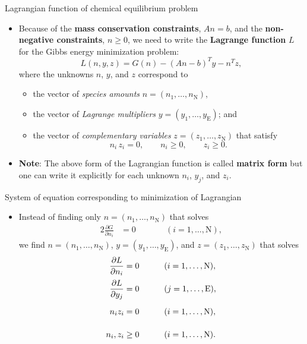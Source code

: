 %
%
\begin{frame}{Lagrangian function of chemical equilibrium problem}
\begin{itemize}
\item Because of the {\bf mass conservation constraints}, $An=b$, and
the {\bf non-negative constraints}, $n\geq0$, we need to write
the \alert{\textbf{Lagrange function}} $L$ for the Gibbs energy minimization problem:
\[
L(n,y,z)=G(n)-(An-b)^{T}y-n^{T}z,
\]
where the \alert{unknowns} $n$, $y$, and $z$ correspond to
%
\begin{itemize}
\item the vector of \emph{species amounts} $n=(n_{1},\ldots,n_{\text{N}})$, 
\item the vector of \emph{Lagrange multipliers} $y=(y_{1},\ldots,y_{\text{E}})$; and 
\item the vector of \emph{complementary variables} $z=(z_{1},\ldots,z_{\text{N}})$ that satisfy 
%	
\[
n_{i}\, z_{i}=0,\qquad n_{i}\geq0,\qquad z_{i}\geq0.
\]
\end{itemize}
\pause
\item {\bf Note}: The above form of the Lagrangian function is called {\bf matrix form} but one can write it explicitly for each unknown $n_{i}$, $y_{j}$, and $z_{i}$. 
\end{itemize}
\end{frame}
%
%
\begin{frame}{System of equation corresponding to minimization of Lagrangian}
\begin{itemize}
\item Instead of finding \alert{only} $n=(n_{1},\ldots,n_{\text{N}})$ that solves 
\begin{alignat*}{2}
\frac{\partial G}{\partial n_{i}} & =0 & \qquad & (i=1,\ldots,\text{N}),
\end{alignat*}
\pause
 we find \alert{$n=(n_{1},\ldots,n_{\text{N}})$}, \alert{$y=(y_{1},\ldots,y_{\text{E}})$},
and \alert{$z=(z_{1},\ldots,z_{\text{N}})$} that solves 
\begin{alignat*}{2}
\frac{\partial L}{\partial n_{i}} & =0 & \qquad\vphantom{\frac{\partial L}{\partial y_{j}}} & (i=1,\ldots,\text{N}),\\
\frac{\partial L}{\partial y_{j}} & =0 & \vphantom{\frac{\partial L}{\partial y_{j}}} & (j=1,\ldots,\text{E}),\\
n_{i}z_{i} & =0 & \vphantom{\frac{\partial L}{\partial y_{j}}} & (i=1,\ldots,\text{N}),\\
n_{i},z_{i} & \geq0 & \vphantom{\frac{\partial L}{\partial y_{j}}} & (i=1,\ldots,\text{N}).
\end{alignat*}
\end{itemize}
\end{frame}
